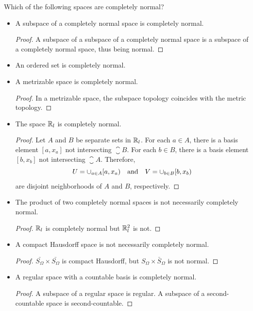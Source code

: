 \documentclass[12pt,a4paper]{article}
\begin{document}
    \begin{ex}
        Which of the following spaces are completely normal?
        \begin{itemize}
            \item A subspace of a completely normal space is completely normal. 
            \begin{proof}
                A subspace of a subspace of a completely normal space is a subspace of a completely normal space, thus being normal.
            \end{proof}
            \item An ordered set is completely normal.
            \item A metrizable space is completely normal.
            \begin{proof}
                In a metrizable space, the subspace topology coincides with the metric topology.
            \end{proof}
            \item The space $\mathbb{R}_l$ is completely normal.
            \begin{proof}
                Let $A$ and $B$ be separate sets in $\mathbb{R}_l$. For each $a\in A$, there is a basis element $[a,x_a]$ not intersecting $\closure{B}$. For each $b\in B$, there is a basis element $[b,x_b]$ not intersecting $\closure{A}$. Therefore,
                $$
                U=\cup_{a\in A}[a,x_a)\quad\text{and}\quad V=\cup_{b\in B}[b,x_b)
                $$
                are disjoint neighborhoods of $A$ and $B$, respectively.
            \end{proof}
            \item The product of two completely normal spaces is not necessarily completely normal.
            \begin{proof}
                $\mathbb{R}_l$ is completely normal but $\mathbb{R}_l^2$ is not.
            \end{proof}
            \item A compact Hausdorff space is not necessarily completely normal.
            \begin{proof}
                $\bar{S_\Omega}\times\bar{S_\Omega}$ is compact Hausdorff, but $S_\Omega\times\bar{S}_\Omega$ is not normal.
            \end{proof}
            \item A regular space with a countable basis is completely normal.
            \begin{proof}
                A subspace of a regular space is regular. A subspace of a second-countable space is second-countable.
            \end{proof}
        \end{itemize}
    \end{ex}
    \hfill
\end{document}

